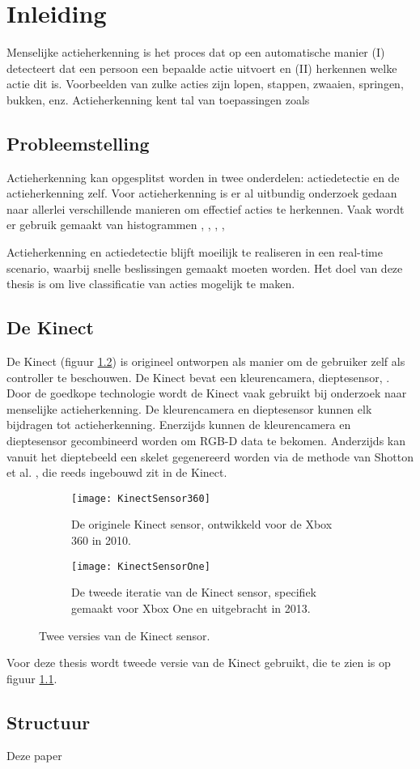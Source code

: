\setcounter{page}{1}
\chapter{Inleiding}
\label{ch:Inleiding}
Menselijke actieherkenning is het proces dat op een automatische manier (I) detecteert dat een persoon een bepaalde actie uitvoert en (II) herkennen welke actie dit is. Voorbeelden van zulke acties zijn lopen, stappen, zwaaien, springen, bukken, enz. Actieherkenning kent tal van toepassingen zoals 




\section{Probleemstelling}
Actieherkenning kan opgesplitst worden in twee onderdelen: actiedetectie en de actieherkenning zelf. Voor actieherkenning is er al uitbundig onderzoek gedaan naar allerlei verschillende manieren om effectief acties te herkennen. Vaak wordt er gebruik gemaakt van histogrammen \cite{Xia2012},
\cite{Chen2017},
\cite{Vezzani2010},
\cite{Mendoza2007}, 


Actieherkenning en actiedetectie blijft moeilijk te realiseren in een real-time scenario, waarbij snelle beslissingen gemaakt moeten worden. Het doel van deze thesis is om live classificatie van acties mogelijk te maken. 



\section{De Kinect}
De Kinect (figuur \ref{fig:KinectSensorVersies}) is origineel ontworpen als manier om de gebruiker zelf als controller te beschouwen. De Kinect bevat een kleurencamera, dieptesensor, . Door de goedkope technologie wordt de Kinect vaak gebruikt bij onderzoek naar menselijke actieherkenning. De kleurencamera en dieptesensor kunnen elk bijdragen tot actieherkenning. Enerzijds kunnen de kleurencamera en dieptesensor gecombineerd worden om RGB-D data te bekomen. Anderzijds kan vanuit het dieptebeeld een skelet gegenereerd worden via de methode van Shotton et al. \cite{Shotton2011}, die reeds ingebouwd zit in de Kinect.
\begin{figure}
	\begin{subfigure}[t]{0.48\textwidth}
		\texttt{[image: KinectSensor360]}
		\caption{De originele Kinect sensor, ontwikkeld voor de Xbox 360 in 2010.}
	\end{subfigure}
	\begin{subfigure}[t]{0.48\textwidth}
		\texttt{[image: KinectSensorOne]}
		\caption{De tweede iteratie van de Kinect sensor, specifiek gemaakt voor Xbox One en uitgebracht in 2013.}
		\label{fig:KinectSensorOne}
	\end{subfigure}
	\caption{Twee versies van de Kinect sensor.}
	\label{fig:KinectSensorVersies}
\end{figure}

Voor deze thesis wordt tweede versie van de Kinect gebruikt, die te zien is op figuur \ref{fig:KinectSensorOne}.


\section{Structuur}
Deze paper 
